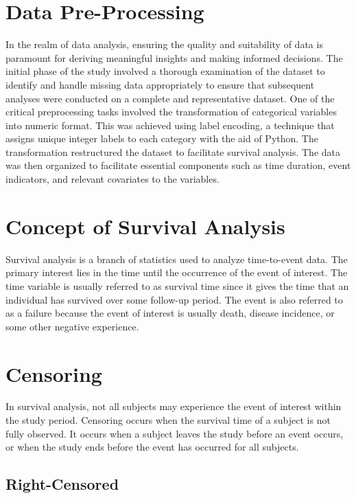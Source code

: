 \documentclass[doublespacing]{report} %
\begin{document}
\section{Data Pre-Processing}

In the realm of data analysis, ensuring the quality and suitability of data is paramount for deriving meaningful insights and making informed decisions. The initial phase of the study involved a thorough examination of the dataset to identify and handle missing data appropriately to ensure that subsequent analyses were conducted on a complete and representative dataset. One of the critical preprocessing tasks involved the transformation of categorical variables into numeric format. This was achieved using label encoding, a technique that assigns unique integer labels to each category with the aid of Python. The transformation restructured the dataset to facilitate survival analysis. The data was then organized to facilitate essential components such as time duration, event indicators, and relevant covariates to the variables. 

\section{Concept of Survival Analysis}

Survival analysis is a branch of statistics used to analyze time-to-event data. The primary interest lies in the time until the occurrence of the event of interest.  The time variable is usually referred to as survival time since it gives the time that an individual has survived over some follow-up period. The event is also referred to as a failure because the event of interest is usually death, disease incidence, or some other negative experience. 

\section{Censoring}

In survival analysis, not all subjects may experience the event of interest within the study period. Censoring occurs when the survival time of a subject is not fully observed. It occurs when a subject leaves the study before an event occurs, or when the study ends before the event has occurred for all subjects.


\subsection{Right-Censored}
\end{document}
